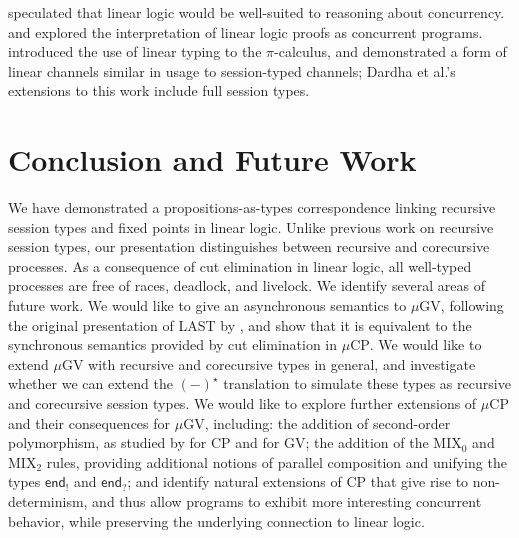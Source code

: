 \documentclass[orivec,envcountsame]{llncs}
\newcommand{\outterm}{\mkwd{end}_!}
\newcommand{\interm}{\mkwd{end}_?}
\newcommand{\mkwd}[1]{\mathsf{#1}}
\newcommand{\topi}[1]{({#1})^\star}
\newcommand{\mucp}{$\mu\mathrm{CP}$\xspace}
\newcommand{\mugv}{$\mu\mathrm{GV}$\xspace}
\begin{document}
\citet{Girard87} speculated that linear logic would be well-suited to reasoning about concurrency.
\citet{Abramsky92} and \citet{BellinScott94} explored the interpretation of linear logic proofs as
concurrent programs. \citet{Kobayashi96} introduced the use of linear typing to the $\pi$-calculus,
and demonstrated a form of linear channels similar in usage to session-typed channels; Dardha et
al.'s~\citeyearpar{Dardha12} extensions to this work include full session types.

\section{Conclusion and Future Work}\label{sec:future}

We have demonstrated a propositions-as-types correspondence linking recursive session types and
fixed points in linear logic. Unlike previous work on recursive session types, our presentation
distinguishes between recursive and corecursive processes. As a consequence of cut elimination in
linear logic, all well-typed processes are free of races, deadlock, and livelock. We identify
several areas of future work.
%
We would like to give an asynchronous semantics to \mugv, following the original presentation of
LAST by \citet{GayVasconcelos10}, and show that it is equivalent to the synchronous semantics
provided by cut elimination in \mucp.
%
We would like to extend \mugv with recursive and corecursive types in general, and investigate
whether we can extend the $\topi{-}$ translation to simulate these types as recursive and
corecursive session types.
%
We would like to explore further extensions of \mucp and their consequences for \mugv, including:
the addition of second-order polymorphism, as studied by \citet{Wadler12} for CP and
\citet{LindleyM14} for GV; the addition of the MIX$_0$ and MIX$_2$ rules, providing additional
notions of parallel composition and unifying the types $\outterm$ and $\interm$; and identify
natural extensions of CP that give rise to non-determinism, and thus allow programs to exhibit more
interesting concurrent behavior, while preserving the underlying connection to linear logic.

\label{sect:bib}
 
\end{document}
